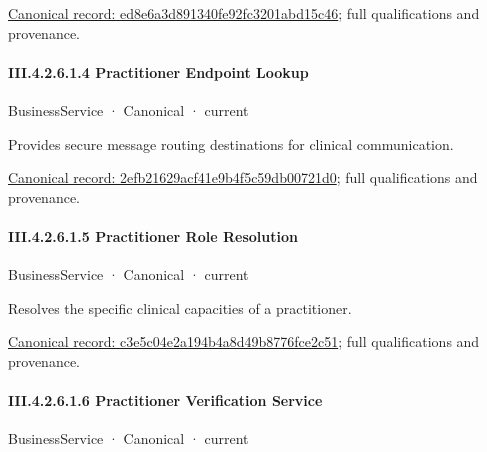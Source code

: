 {\footnotesize \href{../../../../../../../continuum/business/business-service/ed8e6a3d891340fe92fc3201abd15c46.md}{Canonical record: ed8e6a3d891340fe92fc3201abd15c46}; full qualifications and provenance.}\par
\paragraph*{III.4.2.6.1.4 Practitioner Endpoint Lookup}
\label{navigation:III.4.2.6.1.4}

\label{element:2efb21629acf41e9b4f5c59db00721d0}
{\small BusinessService · Canonical · current}\par

Provides secure message routing destinations for clinical communication.


{\footnotesize \href{../../../../../../../continuum/business/business-service/2efb21629acf41e9b4f5c59db00721d0.md}{Canonical record: 2efb21629acf41e9b4f5c59db00721d0}; full qualifications and provenance.}\par
\paragraph*{III.4.2.6.1.5 Practitioner Role Resolution}
\label{navigation:III.4.2.6.1.5}

\label{element:c3e5c04e2a194b4a8d49b8776fce2c51}
{\small BusinessService · Canonical · current}\par

Resolves the specific clinical capacities of a practitioner.


{\footnotesize \href{../../../../../../../continuum/business/business-service/c3e5c04e2a194b4a8d49b8776fce2c51.md}{Canonical record: c3e5c04e2a194b4a8d49b8776fce2c51}; full qualifications and provenance.}\par
\paragraph*{III.4.2.6.1.6 Practitioner Verification Service}
\label{navigation:III.4.2.6.1.6}

\label{element:adf039a87e9243a1b82612a4919f6f14}
{\small BusinessService · Canonical · current}\par

